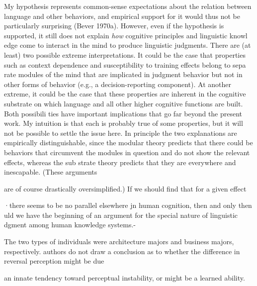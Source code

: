 \begin{styleTextbody}
My hypothesis represents common-sense expectations about the relation between language and other behaviors, and empirical support for it would thus not be particularly surprising (Bever 1970a). However, even if the hypothesis is supported, it still does not explain \textit{how}\textit{ }cognitive principles and linguistic knowl\- edge come to interact in the mind to produce linguistic judgments. There are (at least) two possible extreme interpretations. It could be the case that properties such as context dependence and susceptibility to training effects belong to sepa\- rate modules of the mind that are implicated in judgment behavior but not in other forms of behavior (e.g., a decision-reporting component). At another extreme, it could be the case that these properties are inherent in the cognitive substrate on which language and all other higher cognitive functions are built. Both possibili\- ties have important implications that go far beyond the present work. My intuition is that each is probably true of some properties, but it will not be possible to settle the issue here. In principle the two explanations are empirically distinguishable, since the modular theory predicts that there could be behaviors that circumvent the modules in question and do not show the relevant effects, whereas the sub\- strate theory predicts that they are everywhere and inescapable. (These arguments
\end{styleTextbody}


\begin{styleTextbody}
are of course drastically oversimplified.) If we should find that for a given effect
\end{styleTextbody}


\begin{styleTextbody}
·there seems to be no parallel elsewhere jn human cognition, then and only then uld we have the beginning of an argument for the special nature of linguistic dgment among human knowledge systems.-
\end{styleTextbody}


\begin{listWWNumlxixleveli}
\item 
\begin{styleStandard}
The two types of individuals were architecture majors and business majors, respectively. authors do not draw a conclusion as to whether the difference in reversal perception might be due
\end{styleStandard}


\end{listWWNumlxixleveli}
\begin{styleStandard}
an innate tendency toward perceptual instability, or might be a learned ability.
\end{styleStandard}


